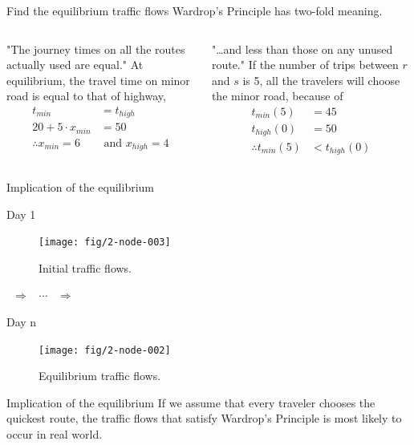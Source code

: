 \documentclass[handout]{beamer}
\begin{document}
\begin{frame}{Find the equilibrium traffic flows}
Wardrop's Principle has two-fold meaning. 
\begin{columns}
\pause
{}
\begin{block}{"The journey times on all the routes actually used are equal."}
At equilibrium, the travel time on minor road is equal to that of highway, 
\begin{align*}
 t_{min} &= t_{high}\\
20 + 5 \cdot x_{min} &= 50 \\
\therefore x_{min} = 6 &\text{ and } x_{high} = 4
\end{align*}
\end{block}
\pause
{}
\begin{block}{"\dots and less than those on any unused route."}
If the number of trips between $r$ and $s$ is 5, all the travelers will choose 
the minor road, because of
\begin{align*}
t_{min}(5) &= 45\\
t_{high}(0) &= 50\\
\therefore t_{min}(5) &< t_{high}(0)
\end{align*}
\end{block}
\end{columns}

\end{frame}

\begin{frame}{Implication of the equilibrium}
\begin{minipage}{.4\linewidth}
\begin{block}{Day 1}
\begin{figure}
\centering
\texttt{[image: fig/2-node-003]}
\caption{Initial traffic flows. }
\end{figure}
\end{block}
\end{minipage}%
~$\Rightarrow$~%
$\cdots$%
~$\Rightarrow$~%
\begin{minipage}{.4\linewidth}
\begin{block}{Day n}
\begin{figure}
\centering
\texttt{[image: fig/2-node-002]}
\caption{Equilibrium traffic flows.}
\end{figure}
\end{block}
\end{minipage}
\pause
\begin{block}{Implication of the equilibrium}
If we assume that every traveler chooses the \alert{quickest route}, the traffic flows
that \alert{satisfy Wardrop's Principle} is most likely to occur in real world. 
\end{block}

\end{frame}
\end{document}
